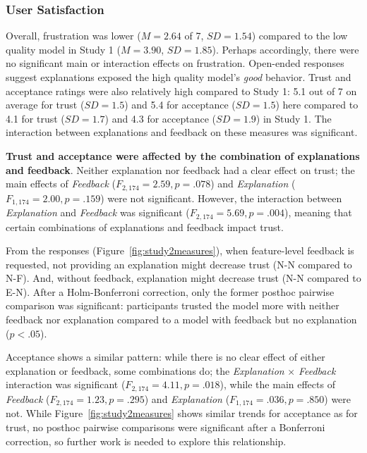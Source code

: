 \subsubsection{User Satisfaction}
%
Overall, frustration was lower ($M=2.64$ of 7, $SD=1.54$) compared to the low quality model in Study 1 ($M=3.90$, $SD=1.85$). Perhaps accordingly, there were no significant main or interaction effects on frustration. Open-ended responses suggest explanations exposed the high quality model's \textit{good} behavior.
%
Trust and acceptance ratings were also relatively high compared to Study 1: 5.1 out of 7 on average for trust ($SD=1.5$) and 5.4 for acceptance ($SD=1.5$) here compared to 4.1 for trust ($SD=1.7$) and 4.3 for acceptance ($SD=1.9$) in Study 1. The interaction between explanations and feedback on these measures was significant.

\textbf{Trust and acceptance were affected by the combination of explanations and feedback}.
%
Neither explanation nor feedback had a clear effect on trust; the main effects of \textit{Feedback} ($F_{2,174}=2.59, p=.078$) and \textit{Explanation} ($F_{1,174}=2.00, p=.159$) were not significant. However, the interaction between \textit{Explanation} and \textit{Feedback} was significant ($F_{2,174}=5.69, p=.004$), meaning that certain combinations of explanations and feedback impact trust. 

From the responses (Figure~\ref{fig:study2measures}), when feature-level feedback is requested, not providing an explanation might decrease trust (N-N compared to N-F). And, without feedback, explanation might decrease trust (N-N compared to E-N). After a Holm-Bonferroni correction, only the former posthoc pairwise comparison was significant: participants trusted the model more with neither feedback nor explanation compared to a model with feedback but no explanation ($p < .05$). 

Acceptance shows a similar pattern: while there is no clear effect of either explanation or feedback, some combinations do; the \textit{Explanation} $\times$ \textit{Feedback} interaction was significant ($F_{2,174}=4.11, p=.018$), while the main effects of \textit{Feedback} ($F_{2,174}=1.23, p=.295$) and \textit{Explanation} ($F_{1,174}=.036, p=.850$) were not. While Figure~\ref{fig:study2measures} shows similar trends for acceptance as for trust, no posthoc pairwise comparisons were significant after a Bonferroni correction, so further work is needed to explore this relationship.

